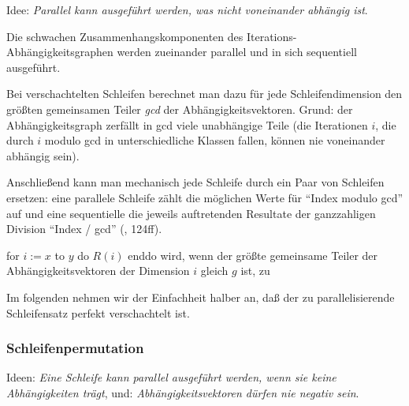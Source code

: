 Idee: \textit{Parallel kann ausgeführt werden, was nicht voneinander
abhängig ist}.

Die schwachen Zusammenhangskomponenten des
Iterations-Abhängigkeitsgraphen werden zueinander parallel und in sich
sequentiell ausgeführt.

Bei verschachtelten Schleifen berechnet man dazu für jede
Schleifendimension den größten gemeinsamen Teiler \textit{gcd} der
Abhängigkeitsvektoren. Grund: der Abhängigkeitsgraph zerfällt in gcd
viele unabhängige Teile (die Iterationen $i$, die durch $i$ modulo gcd
in unterschiedliche Klassen fallen, können nie voneinander abhängig
sein).

Anschließend kann man mechanisch jede Schleife durch ein Paar von
Schleifen ersetzen: eine parallele Schleife zählt die möglichen Werte
für ``Index modulo gcd'' auf und eine sequentielle die jeweils
auftretenden Resultate der ganzzahligen Division ``Index / gcd'' (\cite{Ban94},
124ff).

{\sffamily for $i:=x$ to $y$ do $R(i)$ enddo} wird, wenn der größte
gemeinsame Teiler der Abhängigkeitsvektoren der Dimension $i$ gleich
$g$ ist, zu


\begin{algorithm}[H]
\end{algorithm}


\bigskip

Im folgenden nehmen wir der Einfachheit halber an, daß der zu
parallelisierende Schleifensatz perfekt verschachtelt ist.

\subsubsection{Schleifenpermutation}

Ideen: \textit{Eine Schleife kann parallel ausgeführt werden, wenn sie keine
Abhängigkeiten trägt}, und: \textit{Abhängigkeitsvektoren dürfen nie
negativ sein}.

